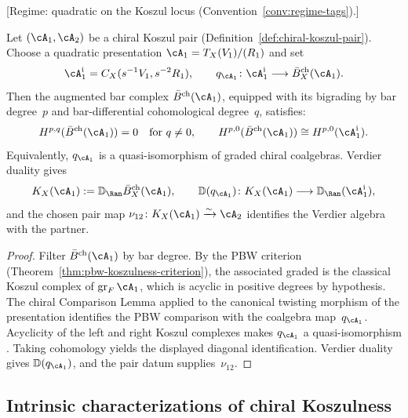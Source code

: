 \begin{theorem}
\label{thm:bar-concentration}
\textup{[Regime: quadratic on the Koszul locus
\textup{(}Convention~\textup{\ref{conv:regime-tags})}.]}

Let $(\cA_1, \cA_2)$ be a chiral Koszul pair
\textup{(}Definition~\textup{\ref{def:chiral-koszul-pair}}\textup{)}.
Choose a quadratic presentation
$\cA_1=T_X(V_1)/(R_1)$ and set
\[
\cA_1^{\mathrm i}=C_X(s^{-1}V_1,s^{-2}R_1),\qquad
q_{\cA_1}\colon\cA_1^{\mathrm i}\longrightarrow
\bar B_X^{\mathrm{ch}}(\cA_1).
\]
Then the augmented bar complex $\bar{B}^{\mathrm{ch}}(\cA_1)$,
equipped with its bigrading by bar degree~$p$ and bar-differential
cohomological degree~$q$, satisfies:
\[
H^{p,q}(\bar{B}^{\mathrm{ch}}(\cA_1)) = 0
\quad\text{for } q \neq 0,
\qquad
H^{p,0}(\bar{B}^{\mathrm{ch}}(\cA_1))
\cong H^{p,0}(\cA_1^{\mathrm i}).
\]
Equivalently,
$q_{\cA_1}$ is a quasi-isomorphism of graded chiral coalgebras.
Verdier duality gives
\[
K_X(\cA_1):=\mathbb D_{\Ran}\bar B_X^{\mathrm{ch}}(\cA_1),
\qquad
\mathbb D(q_{\cA_1})\colon
K_X(\cA_1)\longrightarrow\mathbb D_{\Ran}(\cA_1^{\mathrm i}),
\]
and the chosen pair map
$\nu_{12}\colon K_X(\cA_1)\xrightarrow{\sim}\cA_2$
identifies the Verdier algebra with the partner.
\end{theorem}

\begin{proof}
Filter $\bar{B}^{\mathrm{ch}}(\cA_1)$ by bar degree.
By the PBW criterion (Theorem~\ref{thm:pbw-koszulness-criterion}),
the associated graded is the classical Koszul complex of
$\operatorname{gr}_F \cA_1$, which is acyclic in positive
degrees by hypothesis.
The chiral Comparison Lemma applied to the canonical twisting
morphism of the presentation identifies the PBW comparison with the
coalgebra map~$q_{\cA_1}$.  Acyclicity of the left and right Koszul
complexes makes $q_{\cA_1}$ a quasi-isomorphism
\cite[Theorem~2.3.2]{LodayVallette12}.  Taking cohomology yields the
displayed diagonal identification.  Verdier duality gives
$\mathbb D(q_{\cA_1})$, and the pair datum supplies~$\nu_{12}$.
\end{proof}


\subsection{Intrinsic characterizations of chiral Koszulness}
\label{sec:intrinsic-characterizations-koszulness}

